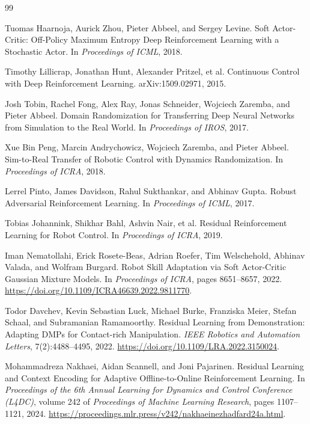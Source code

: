 \documentclass[10pt,twocolumn,letterpaper]{article}
\begin{document}
\begin{thebibliography}{99}

Tuomas Haarnoja, Aurick Zhou, Pieter Abbeel, and Sergey Levine.
\newblock Soft Actor-Critic: Off-Policy Maximum Entropy Deep Reinforcement Learning with a Stochastic Actor.
\newblock In \emph{Proceedings of ICML}, 2018.

Timothy Lillicrap, Jonathan Hunt, Alexander Pritzel, et al.
\newblock Continuous Control with Deep Reinforcement Learning.
\newblock arXiv:1509.02971, 2015.

Josh Tobin, Rachel Fong, Alex Ray, Jonas Schneider, Wojciech Zaremba, and Pieter Abbeel.
\newblock Domain Randomization for Transferring Deep Neural Networks from Simulation to the Real World.
\newblock In \emph{Proceedings of IROS}, 2017.

Xue Bin Peng, Marcin Andrychowicz, Wojciech Zaremba, and Pieter Abbeel.
\newblock Sim-to-Real Transfer of Robotic Control with Dynamics Randomization.
\newblock In \emph{Proceedings of ICRA}, 2018.

Lerrel Pinto, James Davidson, Rahul Sukthankar, and Abhinav Gupta.
\newblock Robust Adversarial Reinforcement Learning.
\newblock In \emph{Proceedings of ICML}, 2017.

Tobias Johannink, Shikhar Bahl, Ashvin Nair, et al.
\newblock Residual Reinforcement Learning for Robot Control.
\newblock In \emph{Proceedings of ICRA}, 2019.

Iman Nematollahi, Erick Rosete-Beas, Adrian Roefer, Tim Welschehold, Abhinav Valada, and Wolfram Burgard.
\newblock Robot Skill Adaptation via Soft Actor-Critic Gaussian Mixture Models.
\newblock In \emph{Proceedings of ICRA}, pages 8651--8657, 2022.
\newblock \url{https://doi.org/10.1109/ICRA46639.2022.9811770}.

Todor Davchev, Kevin Sebastian Luck, Michael Burke, Franziska Meier, Stefan Schaal, and Subramanian Ramamoorthy.
\newblock Residual Learning from Demonstration: Adapting DMPs for Contact-rich Manipulation.
\newblock \emph{IEEE Robotics and Automation Letters}, 7(2):4488--4495, 2022.
\newblock \url{https://doi.org/10.1109/LRA.2022.3150024}.

Mohammadreza Nakhaei, Aidan Scannell, and Joni Pajarinen.
\newblock Residual Learning and Context Encoding for Adaptive Offline-to-Online Reinforcement Learning.
\newblock In \emph{Proceedings of the 6th Annual Learning for Dynamics and Control Conference (L4DC)},
volume 242 of \emph{Proceedings of Machine Learning Research}, pages 1107--1121, 2024.
\newblock \url{https://proceedings.mlr.press/v242/nakhaeinezhadfard24a.html}.


\end{thebibliography}
\end{document}
